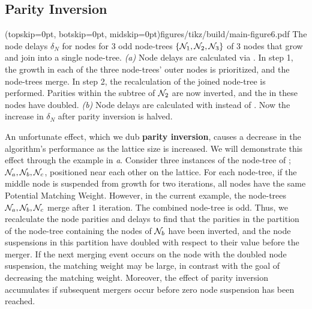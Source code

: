\subsection{Parity Inversion}\label{sec:inversion}

\Figure[tb](topskip=0pt, botskip=0pt, midskip=0pt){figures/tikz/build/main-figure6.pdf}{
    The node delays $\delta_N$ for nodes for 3 odd node-trees $\{\mathcal{N}_1, \mathcal{N}_2, \mathcal{N}_3\}$ of 3 nodes that grow and join into a single node-tree. \emph{(a)} Node delays are calculated via . In step 1, the growth in each of the three node-trees' outer nodes is prioritized, and the node-trees merge. In step 2, the recalculation of the joined node-tree is performed. Parities within the subtree of $\mathcal{N}_2$ are now inverted, and the  in these nodes have doubled. \emph{(b)} Node delays are calculated with  instead of . Now the increase in $\delta_N$ after parity inversion is halved.\label{fig:partialdfs}}

An unfortunate effect, which we dub \textbf{parity inversion}, causes a decrease in the algorithm's performance as the lattice size is increased. We will demonstrate this effect through the example in \emph{a}. Consider three instances of the node-tree of ; $\mathcal{N}_a, \mathcal{N}_b, \mathcal{N}_c$, positioned near each other on the lattice. For each node-tree, if the middle node is suspended from growth for two iterations, all nodes have the same Potential Matching Weight. However, in the current example, the node-trees $\mathcal{N}_a, \mathcal{N}_b, \mathcal{N}_c$ merge after 1 iteration. The combined node-tree is odd. Thus, we recalculate the node parities and delays to find that the parities in the partition of the node-tree containing the nodes of $\mathcal{N}_b$ have been inverted, and the node suspensions in this partition have doubled with respect to their value before the merger. If the next merging event occurs on the node with the doubled node suspension, the matching weight may be large, in contrast with the goal of decreasing the matching weight. Moreover, the effect of parity inversion accumulates if subsequent mergers occur before zero node suspension has been reached. %

